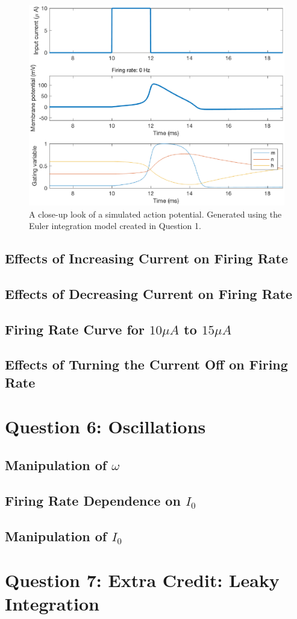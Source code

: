 \documentclass[11pt, oneside]{article}
\begin{document}
\begin{figure}[ht!]
\centering
\includegraphics[width=1\textwidth]{simulate_hh_action_potential.eps}
\caption{A close-up look of a simulated action potential. Generated using the Euler integration model created in Question 1.}
\label{fig:action_potential_close_up}
\end{figure}

\subsection{Effects of Increasing Current on Firing Rate}

\subsection{Effects of Decreasing Current on Firing Rate}

\subsection{Firing Rate Curve for $10\mu A$ to $15\mu A$}

\subsection{Effects of Turning the Current Off on Firing Rate}

\section{Question 6: Oscillations}

\subsection{Manipulation of $\omega$}

\subsection{Firing Rate Dependence on $I_0$}

\subsection{Manipulation of $I_0$}

\section{Question 7: Extra Credit: Leaky Integration}
\end{document}

